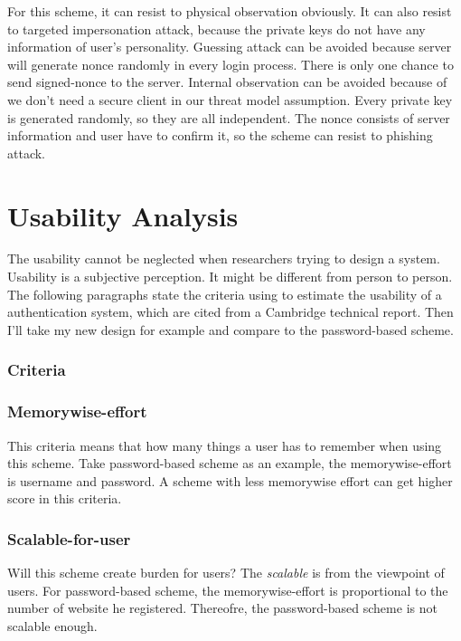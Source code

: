 \begin{CJK}{Bg5}{bsmi}
For this scheme, it can resist to physical observation obviously. It can also resist to targeted impersonation attack, because the private keys do not have any information of user's personality. Guessing attack can be avoided because server will generate nonce randomly in every login process. There is only one chance to send signed-nonce to the server. Internal observation can be avoided because of we don't need a secure client in our threat model assumption. Every private key is generated randomly, so they are all independent. The nonce consists of server information and user have to confirm it, so the scheme can resist to phishing attack.

\section{Usability Analysis}

The usability cannot be neglected when researchers trying to design a system. Usability is a subjective perception. It might be different from person to person.
The following paragraphs state the criteria using to estimate the usability of a authentication system, which are cited from a Cambridge technical report\cite{password-extended}. Then I'll take my new design for example and compare to the password-based scheme.

\subsubsection{Criteria}

\subsubsection{Memorywise-effort}

This criteria means that how many things a user has to remember when using this scheme. Take password-based scheme as an example, the memorywise-effort is username and password. A scheme with less memorywise effort can get higher score in this criteria.

\subsubsection{Scalable-for-user}

Will this scheme create burden for users? The \emph{scalable} is from the viewpoint of users. For password-based scheme, the memorywise-effort is proportional to the number of website he registered. Thereofre, the password-based scheme is not scalable enough.


\end{CJK}
